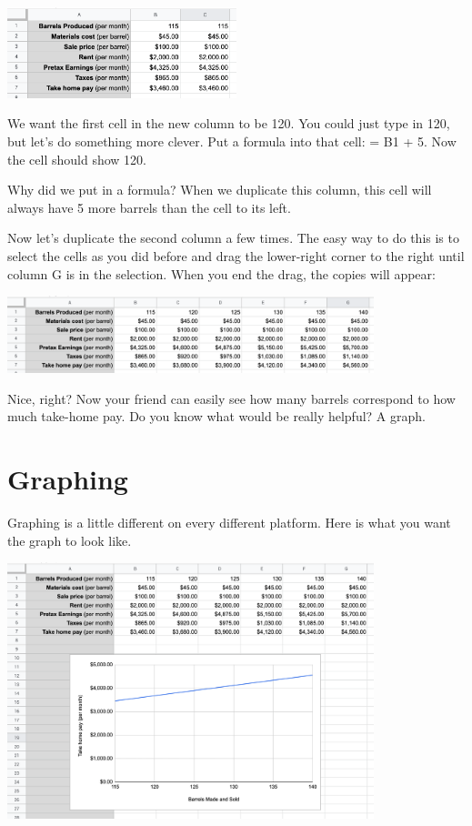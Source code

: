 \includegraphics[width=0.5\textwidth]{BarrelCopyPaste.png}

We want the first cell in the new column to be 120. You could just
type in 120, but let's do something more clever.  Put a formula into that
cell: = B1 + 5.  Now the cell should show 120.

Why did we put in a formula? When we duplicate this column, this cell
will always have 5 more barrels than the cell to its left.

Now let's duplicate the second column a few times. The easy way to do
this is to select the cells as you did before and drag the lower-right
corner to the right until column G is in the selection. When you end
the drag, the copies will appear:

\includegraphics[width=0.8\textwidth]{BarrelDragPaste.png}

Nice, right? Now your friend can easily see how many barrels
correspond to how much take-home pay. Do you know what would be really helpful? A graph.

\section{Graphing}

Graphing is a little different on every different platform.  Here is what you want the graph to look like.

\includegraphics[width=0.8\textwidth]{BarrelGraph.png}

